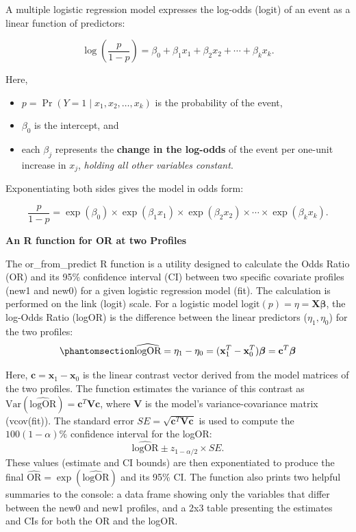 \documentclass[
  letterpaper,
]{scrbook}
\providecommand{\tightlist}{%
  \setlength{\itemsep}{0pt}\setlength{\parskip}{0pt}}\usepackage{longtable,booktabs,array}
\begin{document}
A multiple logistic regression model expresses the log-odds (logit) of
an event as a linear function of predictors:

\[
\log\left(\frac{p}{1-p}\right)
= \beta_0 + \beta_1 x_1 + \beta_2 x_2 + \cdots + \beta_k x_k.
\]

Here,

\begin{itemize}
\tightlist
\item
  \(p = \Pr(Y = 1 \mid x_1, x_2, \ldots, x_k)\) is the probability of
  the event,
\item
  \(\beta_0\) is the intercept, and
\item
  each \(\beta_j\) represents the \textbf{change in the log-odds} of the
  event per one-unit increase in \(x_j\), \emph{holding all other
  variables constant}.
\end{itemize}

Exponentiating both sides gives the model in odds form:

\[
\frac{p}{1-p}
= \exp(\beta_0)
\times \exp(\beta_1 x_1)
\times \exp(\beta_2 x_2)
\times \cdots
\times \exp(\beta_k x_k).
\]

\textbf{An R function for OR at two Profiles}

The or\_from\_predict R function is a utility designed to calculate the
Odds Ratio (OR) and its 95\% confidence interval (CI) between two
specific covariate profiles (new1 and new0) for a given logistic
regression model (fit). The calculation is performed on the link (logit)
scale. For a logistic model
\(\text{logit}(p) = \eta = \mathbf{X}\boldsymbol{\beta}\), the log-Odds
Ratio (logOR) is the difference between the linear predictors
(\(\eta_1, \eta_0\)) for the two profiles:
\begin{equation}\phantomsection\label{eq-logor}{\widehat{\text{logOR}} = \eta_1 - \eta_0 = (\mathbf{x}_1^T - \mathbf{x}_0^T) \boldsymbol{\beta} = \mathbf{c}^T \boldsymbol{\beta}}\end{equation}

Here, \(\mathbf{c} = \mathbf{x}_1 - \mathbf{x}_0\) is the linear
contrast vector derived from the model matrices of the two profiles. The
function estimates the variance of this contrast as
\(\text{Var}(\widehat{\text{logOR}}) = \mathbf{c}^T \mathbf{V} \mathbf{c}\),
where \(\mathbf{V}\) is the model's variance-covariance matrix
(vcov(fit)). The standard error
\(SE = \sqrt{\mathbf{c}^T \mathbf{V} \mathbf{c}}\) is used to compute
the \(100(1-\alpha)\%\) confidence interval for the logOR:
\[\widehat{\text{logOR}} \pm z_{1-\alpha/2} \times SE.\] These values
(estimate and CI bounds) are then exponentiated to produce the final
\(\widehat{\text{OR}} = \exp(\widehat{\text{logOR}})\) and its 95\% CI.
The function also prints two helpful summaries to the console: a data
frame showing only the variables that differ between the new0 and new1
profiles, and a 2x3 table presenting the estimates and CIs for both the
OR and the logOR.
\end{document}
